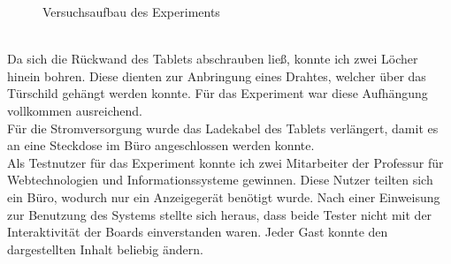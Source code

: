\begin{figure}[h!]
  \centering
  \caption{Versuchsaufbau des Experiments}
  \label{img:Versuchsaufbau}
\end{figure}
\\
Da sich die Rückwand des Tablets abschrauben ließ, konnte ich zwei Löcher hinein bohren. Diese dienten zur Anbringung eines Drahtes, welcher über das Türschild gehängt werden konnte. Für das Experiment war diese Aufhängung vollkommen ausreichend.
\\
Für die Stromversorgung wurde das Ladekabel des Tablets verlängert, damit es an eine Steckdose im Büro angeschlossen werden konnte.
\\
Als Testnutzer für das Experiment konnte ich zwei Mitarbeiter der Professur für Webtechnologien und Informationssysteme gewinnen.
Diese Nutzer teilten sich ein Büro, wodurch nur ein Anzeigegerät benötigt wurde.
Nach einer Einweisung zur Benutzung des Systems stellte sich heraus, dass beide Tester nicht mit der Interaktivität der Boards einverstanden waren.
Jeder Gast konnte den dargestellten Inhalt beliebig ändern.
